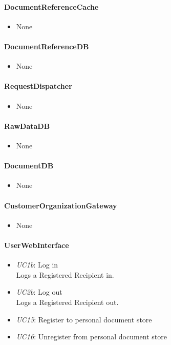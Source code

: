\documentclass[a4paper,10pt]{article}
\begin{document}
\paragraph{DocumentReferenceCache}
\begin{itemize}
	\item None
\end{itemize}

\paragraph{DocumentReferenceDB}
\begin{itemize}
	\item None
\end{itemize}

\paragraph{RequestDispatcher}
\begin{itemize}
	\item None
\end{itemize}

\paragraph{RawDataDB}
\begin{itemize}
	\item None
\end{itemize}

\paragraph{DocumentDB}
\begin{itemize}
	\item None
\end{itemize}

\paragraph{CustomerOrganizationGateway}
\begin{itemize}
	\item None
\end{itemize}

\paragraph{UserWebInterface}
\begin{itemize}
	\item \emph{UC1b}: Log in\\ Logs a Registered Recipient in.
    \item \emph{UC2b}: Log out\\ Logs a Registered Recipient out. 
    \item \emph{UC15}: Register to personal document store
    \item \emph{UC16}: Unregister from personal document store
\end{itemize}
\end{document}

